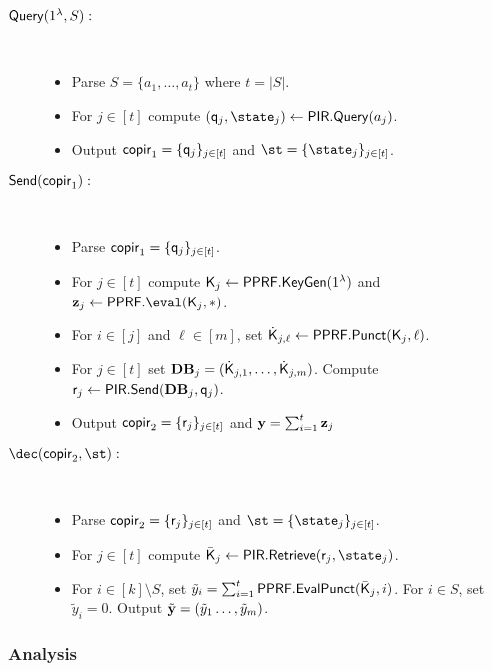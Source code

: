 \begin{description}
\item[$\mathsf{Query}(1^\lambda,S):$]~
\begin{itemize}
    \item Parse $S=\{a_1,\dots, a_t\}$ where $t=|S|$.
    \item For $j\in[t]$ compute $(\quer_j,\state_j)\leftarrow\PIR.\query(a_j)$.
    \item Output $\mathsf{copir}_1=\{\mathsf{q}_j\}_{j\in[t]}$ and $\st=\{\state_j\}_{j\in[t]}$.
\end{itemize}


\item[$\mathsf{Send}(\mathsf{copir}_1):$]~
\begin{itemize}
    \item Parse $\mathsf{copir}_1=\{\mathsf{q}_j\}_{j\in[t]}$.
    \item For $j\in[t]$ compute $\mathsf{K}_j\leftarrow\mathsf{PPRF}.\mathsf{KeyGen}(1^\lambda)$ and $\zn_j\leftarrow\PPRF.\eval(\key_j,\ast)$.
    \item For $i\in[j]$ and $\ell\in[m]$, set $\dot{\mathsf{K}}_{j,\ell}\leftarrow\mathsf{PPRF}.\mathsf{Punct}(\mathsf{K}_j,\ell)$.
    \item For $j\in[t]$ set ${\mathbf{DB}}_j=(\dot{\mathsf{K}}_{j,1},\dots, \dot{\mathsf{K}}_{j,m})$. Compute  $\mathsf{r}_j\leftarrow\mathsf{PIR}.\mathsf{Send}({\mathbf{DB}}_j,\mathsf{q}_j)$. 
  \item Output $\mathsf{copir}_2=\{\mathsf{r}_j\}_{j\in[t]}$ and $\mathbf{y}=\sum_{i=1}^t\mathbf{z}_j$

\end{itemize}

\item[$\dec(\copir_2,\st):$]~
\begin{itemize}
    \item Parse $\mathsf{copir}_2=\{\mathsf{r}_j\}_{j\in[t]}$  and $\st=\{\state_j\}_{j\in[t]}$.
    \item For $j\in[t]$ compute $\bar{\key}_j\leftarrow\PIR.\retrieve(\resp_j,\state_j)$.
    \item For $i\in[k]\setminus S$, set $\tilde y_i=\sum_{i=1}^t \mathsf{PPRF}.\mathsf{EvalPunct}(\bar{\mathsf{K}}_j,i)$. For $i\in S$, set $\tilde y_i=0$. Output $\tilde {\mathbf{y}}=(\tilde y_1\dots, \tilde y_m)$.%
\end{itemize}
\end{description}




\subsubsection{Analysis}


